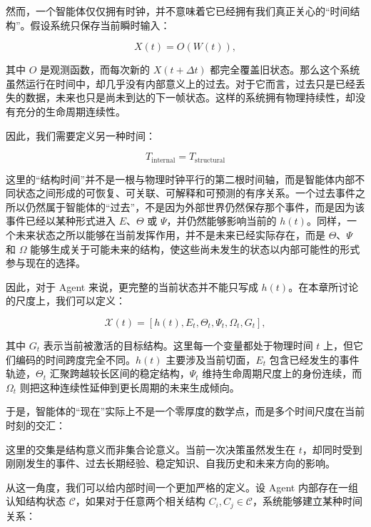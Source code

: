 然而，一个智能体仅仅拥有时钟，并不意味着它已经拥有我们真正关心的“时间结构”。假设系统只保存当前瞬时输入：

\[
X(t)=O(W(t)),
\]

其中 $O$ 是观测函数，而每次新的 $X(t+\Delta t)$ 都完全覆盖旧状态。那么这个系统虽然运行在时间中，却几乎没有内部意义上的过去。对于它而言，过去只是已经丢失的数据，未来也只是尚未到达的下一帧状态。这样的系统拥有物理持续性，却没有充分的生命周期连续性。

因此，我们需要定义另一种时间：

\[
\boxed{
T_{\mathrm{internal}}
=
T_{\mathrm{structural}}
}
\]

这里的“结构时间”并不是一根与物理时钟平行的第二根时间轴，而是智能体内部不同状态之间形成的可恢复、可关联、可解释和可预测的有序关系。一个过去事件之所以仍然属于智能体的“过去”，不是因为外部世界仍然保存那个事件，而是因为该事件已经以某种形式进入 $E$、$\Theta$ 或 $\Psi$，并仍然能够影响当前的 $h(t)$。同样，一个未来状态之所以能够在当前发挥作用，并不是未来已经实际存在，而是 $\Theta$、$\Psi$ 和 $\Omega$ 能够生成关于可能未来的结构，使这些尚未发生的状态以内部可能性的形式参与现在的选择。

因此，对于 Agent 来说，更完整的当前状态并不能只写成 $h(t)$。在本章所讨论的尺度上，我们可以定义：

\[
\mathcal{X}(t)
=
\left[
h(t),
E_t,
\Theta_t,
\Psi_t,
\Omega_t,
G_t
\right],
\]

其中 $G_t$ 表示当前被激活的目标结构。这里每一个变量都处于物理时间 $t$ 上，但它们编码的时间跨度完全不同。$h(t)$ 主要涉及当前切面，$E_t$ 包含已经发生的事件轨迹，$\Theta_t$ 汇聚跨越较长区间的稳定结构，$\Psi_t$ 维持生命周期尺度上的身份连续，而 $\Omega_t$ 则把这种连续性延伸到更长周期的未来生成倾向。

于是，智能体的“现在”实际上不是一个零厚度的数学点，而是多个时间尺度在当前时刻的交汇：

\begin{statementbox}
\centering
{}
\end{statementbox}

这里的交集是结构意义而非集合论意义。当前一次决策虽然发生在 $t$，却同时受到刚刚发生的事件、过去长期经验、稳定知识、自我历史和未来方向的影响。

从这一角度，我们可以给内部时间一个更加严格的定义。设 Agent 内部存在一组认知结构状态 $\mathcal{C}$，如果对于任意两个相关结构 $C_i,C_j\in\mathcal{C}$，系统能够建立某种时间关系：

